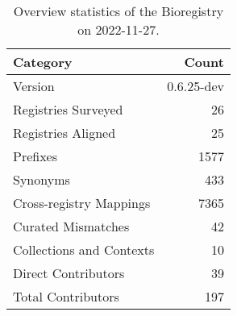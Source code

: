 \begin{table}
\centering
\caption{Overview statistics of the Bioregistry on 2022-11-27.}
\label{tab:bioregistry-summary}
\begin{tabular}{lr}
\toprule
                Category &      Count \\
\midrule
                 Version & 0.6.25-dev \\
     Registries Surveyed &         26 \\
      Registries Aligned &         25 \\
                Prefixes &       1577 \\
                Synonyms &        433 \\
 Cross-registry Mappings &       7365 \\
      Curated Mismatches &         42 \\
Collections and Contexts &         10 \\
     Direct Contributors &         39 \\
      Total Contributors &        197 \\
\bottomrule
\end{tabular}
\end{table}
